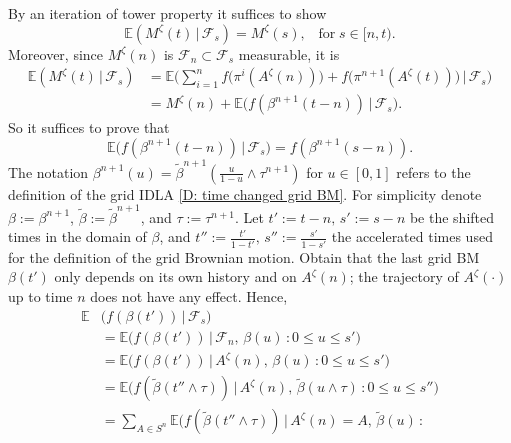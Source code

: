 \documentclass[11pt]{article}
\makeatletter
\renewenvironment{proof}[1][\proofname]{
   \par\pushQED{\qed}\normalfont
   \topsep6\p@\@plus6\p@\relax
   \trivlist\item[\hskip\labelsep\bfseries#1\@addpunct{.}]
   \ignorespaces
}{
   \popQED\endtrivlist\@endpefalse
}
\numberwithin{equation}{section}
\def\AZT{A^{\zeta}(t)}
\def\AZN{A^{\zeta}(n)}
\def\MZT{M^{\zeta}(t)}
\def\Ex{\mathbb{E}}
\def\FS{\mathcal{F}_s}
\def\mydot{\boldsymbol{\cdot}}
\makeatother
\begin{document}
\begin{proof}[Proof of Lemma \ref{lemma M : martingale}]
  By an iteration of tower property  
  it suffices to show 
  \begin{equation}\nonumber
    \Ex( \MZT \,| \, \mathcal{F}_s) = M^{\zeta}(s),
    \;\;\;\text{for}\; s \in [n, t).
  \end{equation} 
  Moreover, since $M^{\zeta}(n)$ is 
  $\mathcal{F}_{n} \subset \mathcal{F}_s$ measurable, 
  it is
  \begin{equation}\nonumber
  \begin{split}
  \Ex(\MZT \,|\, \FS) 
  & = \Ex \bigg( 
          \sum_{i=1}^{n} f \big( \pi^i(A^{\zeta}(n)) \big)
          + f \big( \pi^{n+1}(\AZT) \big) \,\bigg|\, \FS \bigg)\\
  & = M^{\zeta}(n) + 
    \Ex \big(f(\beta^{n+1}(t-n)) \,\big|\, \FS \big).
  \end{split}
  \end{equation}
  So it suffices to prove that
  $$\Ex \big( f(\beta^{n+1}(t-n)) \, \big| \, \FS \big) 
    = f( \beta^{n+1}(s-n)).$$ 
  The notation
  $\beta^{n+1}(u) = \tilde{\beta}^{n+1}(\frac{u}{1-u} \land \tau^{n+1})$
  for $u \in [0,1]$
  refers to the definition of the grid 
  IDLA \eqref{D: time changed grid BM}.
  For simplicity denote 
  $\beta := \beta^{n+1}$, 
  \hbox{$\tilde{\beta} := \tilde{\beta}^{n+1}$}, 
  and $\tau := \tau^{n+1}$. 
  Let $t' := t-n, \, s':= s-n$ be the shifted times 
  in the domain of 
  $\beta$, and
  $t'' := \frac{t'}{1-t'}, \, s'':= \frac{s'}{1-s'}$ 
  the accelerated times used for the definition 
  of the grid Brownian motion. Obtain 
  that the last grid BM $\beta(t')$ only depends on its own 
  history and on $\AZN$; 
  the trajectory of $A^{\zeta}(\mydot)$ up to time 
  $n$ does not have any effect. Hence,
  \begin{equation}
    \nonumber
    \begin{split}
      \Ex & \big(  f(\beta(t')) \,\big|\, \FS \big) \\
      & = \Ex \big( 
        f(\beta(t')) 
          \, \big|\, \mathcal{F}_n, \, \beta(u) \,: 0 \leq u \leq s' \big)\\
      & = \Ex \big( 
        f(\beta(t')) 
          \, \big|\, \AZN , \, \beta(u) \,: 0 \leq u \leq s' \big)\\
      & = \Ex \big( f(\tilde{\beta}(t'' \land \tau))  
        \,\big|\, \AZN ,\, \tilde{\beta}(u \land \tau) \,:
          0 \leq u \leq s''\big) \\
      & = \sum_{A \in S^{n}} 
            \Ex \big( f(\tilde{\beta}(t'' \land \tau) )  
            \, \big|\, \AZN = A,\, \tilde{\beta}(u) \,:

\end{split}
\end{equation}
\end{proof}
\end{document}
